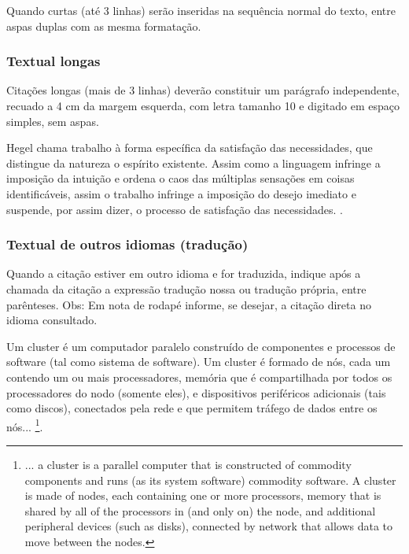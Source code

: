 Quando curtas (até 3 linhas) serão inseridas na sequência normal do texto, entre aspas duplas com as mesma formatação.

\subsubsection{\esp Textual longas}

Citações longas (mais de 3 linhas) deverão constituir um parágrafo independente, recuado a 4 cm da margem esquerda, 
com letra tamanho 10 e digitado em espaço simples, sem aspas.
\begin{citacaodireta}
Hegel chama trabalho à forma específica da satisfação das necessidades, que
distingue da natureza o espírito existente. Assim como a linguagem infringe
a imposição da intuição e ordena o caos das múltiplas sensações em coisas
identificáveis, assim o trabalho infringe a imposição do \hspace{0.1cm}desejo \hspace{0.1cm}imediato \hspace{0.1cm}e
suspende, por assim dizer, o processo de satisfação das necessidades.
\cite[25]{habermas1997}.
\end{citacaodireta}



\subsubsection{\esp Textual de outros idiomas (tradução)}

Quando a citação estiver em outro idioma e for traduzida, indique após a chamada da citação a expressão tradução nossa ou tradução própria, entre parênteses. Obs: Em nota de rodapé informe, se desejar, a citação direta no idioma consultado.

\begin{citacaodireta} 
Um cluster é um computador paralelo construído de componentes e processos de software (tal como sistema de software). 
Um cluster é formado de nós, cada um contendo um ou mais processadores, memória que é compartilhada por todos os processadores do nodo 
(somente eles), e dispositivos periféricos adicionais (tais como discos), conectados pela rede e que permitem tráfego de dados entre os nós...
\cite[p. 10, tradução nossa]{groupp2003}\footnote {... a cluster is a parallel computer that is constructed of commodity  components and runs 
(as its system software) commodity software. A cluster is made of nodes, each 
containing one or more processors, memory that is  shared 
by all of the processors in (and only on) the node, and additional peripheral devices (such as disks), connected by network that allows data to move between the nodes.}.
\end{citacaodireta}
 
